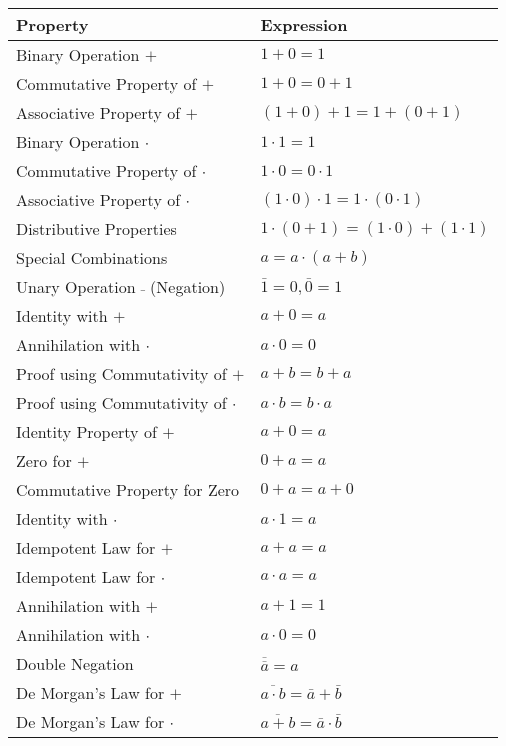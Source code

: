 \begin{longtable}[]{@{}
  >{\raggedright\arraybackslash}p{}
  >{\raggedright\arraybackslash}p{}@{}}
\toprule\noalign{}
\begin{minipage}[b]{\linewidth}\raggedright
Property
\end{minipage} & \begin{minipage}[b]{\linewidth}\raggedright
Expression
\end{minipage} \\
\midrule\noalign{}
\endhead
\bottomrule\noalign{}
\endlastfoot
Binary Operation \(+\) & \(1 + 0 = 1\) \\
Commutative Property of \(+\) & \(1 + 0 = 0 + 1\) \\
Associative Property of \(+\) & \((1 + 0) + 1 = 1 + (0 + 1)\) \\
Binary Operation \(\cdot\) & \(1 \cdot 1 = 1\) \\
Commutative Property of \(\cdot\) & \(1 \cdot 0 = 0 \cdot 1\) \\
Associative Property of \(\cdot\) &
\((1 \cdot 0) \cdot 1 = 1 \cdot (0 \cdot 1)\) \\
Distributive Properties &
\(1 \cdot (0 + 1) = (1 \cdot 0) + (1 \cdot 1)\) \\
Special Combinations & \(a = a \cdot (a + b)\) \\
Unary Operation \(\bar{}\) (Negation) & \(\bar{1} = 0, \bar{0} = 1\) \\
Identity with \(+\) & \(a + 0 = a\) \\
Annihilation with \(\cdot\) & \(a \cdot 0 = 0\) \\
Proof using Commutativity of \(+\) & \(a + b = b + a\) \\
Proof using Commutativity of \(\cdot\) & \(a \cdot b = b \cdot a\) \\
Identity Property of \(+\) & \(a + 0 = a\) \\
Zero for \(+\) & \(0 + a = a\) \\
Commutative Property for Zero & \(0 + a = a + 0\) \\
Identity with \(\cdot\) & \(a \cdot 1 = a\) \\
Idempotent Law for \(+\) & \(a + a = a\) \\
Idempotent Law for \(\cdot\) & \(a \cdot a = a\) \\
Annihilation with \(+\) & \(a + 1 = 1\) \\
Annihilation with \(\cdot\) & \(a \cdot 0 = 0\) \\
Double Negation & \(\overline{\overline{a}} = a\) \\
De Morgan's Law for \(+\) &
\(\overline{a \cdot b} = \bar{a} + \bar{b}\) \\
De Morgan's Law for \(\cdot\) &
\(\overline{a + b} = \bar{a} \cdot \bar{b}\) \\
\end{longtable}


